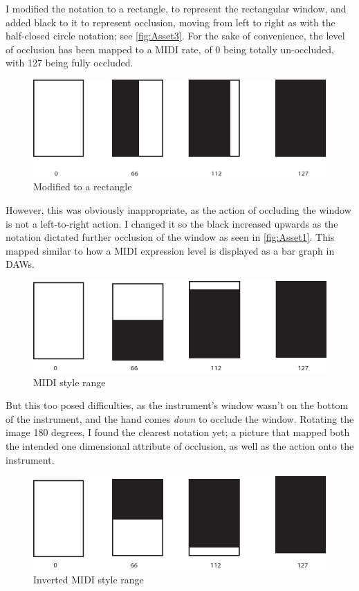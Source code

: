I modified the notation to a rectangle, to represent the rectangular window, and added black to it to represent occlusion, moving from left to right as with the half-closed circle notation; see \autoref{fig:Asset3}.
For the sake of convenience, the level of occlusion has been mapped to a MIDI rate, of 0 being totally un-occluded, with 127 being fully occluded.

\begin{figure}
\includegraphics[width=\linewidth]{./resources/Asset 3.pdf}
\caption{Modified to a rectangle}\label{fig:Asset3}
\end{figure}

However, this was obviously inappropriate, as the action of occluding the window is not a left-to-right action.
I changed it so the black increased upwards as the notation dictated further occlusion of the window as seen in \autoref{fig:Asset1}. 
This mapped similar to how a MIDI expression level is displayed as a bar graph in DAWs. 
\begin{figure}
\includegraphics[width=\linewidth]{./resources/Asset 1.pdf}
\caption{MIDI style range}\label{fig:Asset1}
\end{figure}

But this too posed difficulties, as the instrument's window wasn't on the bottom of the instrument, and the hand comes \emph{down} to occlude the window. 
Rotating the image 180 degrees, I found the clearest notation yet; a picture that mapped both the intended one dimensional attribute of occlusion, as well as the action onto the instrument.

\begin{figure}
\includegraphics[width=\linewidth]{./resources/Asset 2.pdf}
\caption{Inverted MIDI style range}\label{fig:Asset2}
\end{figure}

